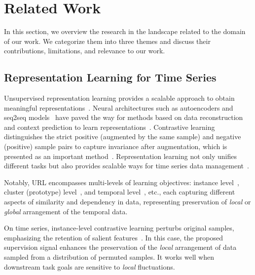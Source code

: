 \section{Related Work}\label{sec:rela}

In this section, we overview the research in the landscape related to the domain of our work. We categorize them into three themes and discuss their contributions, limitations, and relevance to our work.

\subsection{Representation Learning for Time Series}

Unsupervised representation learning provides a scalable approach to obtain meaningful representations~\cite{meng2023unsupervised}. Neural architectures such as autoencoders and seq2seq models~\cite{vadiraja2020survey} have paved the way for methods based on data reconstruction and context prediction to learn representations~\cite{ma2019learning, malhotra2017timenet}. Contrastive learning distinguishes the strict positive (augmented by the same sample) and negative (positive) sample pairs to capture invariance after augmentation, which is presented as an important method~\cite{huynh2022boosting,franceschi2019unsupervised, eldele2021time, yue2022ts2vec, wu2022timesnet}. Representation learning not only unifies different tasks but also provides scalable ways for time series data management~\cite{paparrizos2019grail}.



Notably, URL encompasses multi-levels of learning objectives: instance level~\cite{chen2020big, oord2018representation,chen2020simple}, cluster (prototype) level~\cite{li2020prototypical, caron2020unsupervised, meng2023mhccl}, and temporal level~\cite{tonekaboni2021unsupervised, eldele2021time, hyvarinen2016unsupervised}, etc., each capturing different aspects of similarity and dependency in data, representing preservation of \textit{local} or \textit{global} arrangement of the temporal data.

On time series, instance-level contrastive learning perturbs original samples, emphasizing the retention of salient features~\cite{yue2022ts2vec}. In this case, the proposed supervision signal enhances the preservation of the \textit{local} arrangement of data sampled from a distribution of permuted samples. It works well when downstream task goals are sensitive to \textit{local} fluctuations. 

